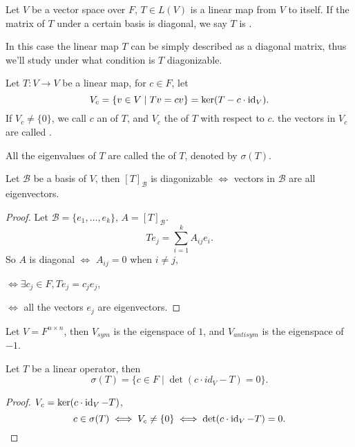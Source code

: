 \begin{definition}
	Let $V$ be a vector space over $F$,
	$T\in L(V)$ is a linear map from $V$ to itself.
	If the matrix of $T$ under a certain basis is diagonal, we say
	$T$ is .
\end{definition}

In this case the linear map $T$ can be simply described as a diagonal matrix,
thus we'll study under what condition is $T$ diagonizable.

\begin{definition}[Eigenvalue]
	Let $T: V\to V$ be a linear map, for $c\in F$,
	let
	\[
		V_c= \{v\in V\mid Tv = cv\} = \ker (T- c\cdot \operatorname{id}_V).
	\]
	If $V_c\ne \{0\}$, we call $c$ an  of $T$,
	and $V_c$ the  of $T$ with respect to $c$.
	the vectors in $V_c$ are called .

	All the eigenvalues of $T$ are called the  of $T$,
	denoted by  $\sigma(T)$.
\end{definition}

\begin{proposition}
	Let $\mathcal{B}$ be a basis of $V$, then  $[T]_{\mathcal{B}}$ is
	diagonizable $\iff$ vectors in $\mathcal{B}$ are all eigenvectors.
\end{proposition}
\begin{proof}[Proof]
	Let $\mathcal{B}=\{e_1,\dots,e_k\}$, $A = [T]_{\mathcal{B}}$.
	\[
	Te_j = \sum_{i=1}^k A_{ij} e_i.
	\]
	So $A$ is diagonal $\iff$ $A_{ij}=0$ when $i\ne j$, 

	$\iff \exists c_j\in F, Te_j = c_j e_j$,

	 $\iff$ all the vectors  $e_j$ are eigenvectors.
\end{proof}
\begin{example}
    Let $V=F^{n\times n}$, then $V_{sym}$ is the eigenspace of $1$,
	and  $V_{antisym}$ is the eigenspace of $-1$.
\end{example}

\begin{lemma}
	\label{lem:eigenpoly}
	Let $T$ be a linear operator, then
	\[
	\sigma(T) = \{c\in F\mid \det (c\cdot id_V - T) = 0\}.
	\]
\end{lemma}
\begin{proof}[Proof]
     $V_c=\ker (c\cdot \operatorname{id}_V - T)$,
	  \[
	 c\in \sigma(T) \iff V_c \ne \{0\} \iff \det(c\cdot \operatorname{id}_V -T) = 0.
	 \]
	 
\end{proof}
